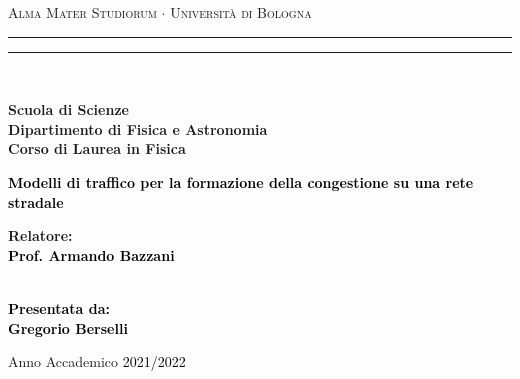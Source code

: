 \documentclass[12pt,a4paper]{report}
\begin{document}
\begin{titlepage}
\begin{center}
{{\Large{\textsc{Alma Mater Studiorum $\cdot$ Universit\`a di Bologna}}}} 
\rule[0.1cm]{15.8cm}{0.1mm}
\rule[0.5cm]{15.8cm}{0.6mm}
\\\vspace{3mm}

{\small{\bf Scuola di Scienze \\ 
Dipartimento di Fisica e Astronomia\\
Corso di Laurea in Fisica}}

\end{center}

\vspace{23mm}

\begin{center}\textcolor{black}{
{\LARGE{\bf Modelli di traffico per la formazione della congestione su una rete stradale}}\\
}\end{center}

\vspace{50mm} \par \noindent

\begin{minipage}[t]{0.47\textwidth}
{\large{\bf Relatore: \vspace{2mm}\\\textcolor{black}{
Prof. Armando Bazzani}\\\\
}}\end{minipage}
%
\hfill
%
\begin{minipage}[t]{0.47\textwidth}\raggedleft \textcolor{black}{
{\large{\bf Presentata da:
\vspace{2mm}\\
Gregorio Berselli}}}
\end{minipage}

\vspace{40mm}

\begin{center}
Anno Accademico \textcolor{black}{2021/2022}
\end{center}

\end{titlepage}
\shipout\null
\end{document}
